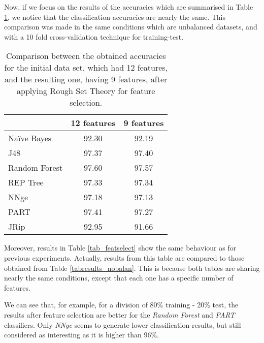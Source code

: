 \documentclass{llncs}
\begin{document}
Now, if we focus on the results of the accuracies which are summarised in Table \ref{tab_12featvs9feat}, we notice that the classification accuracies are nearly the same. This comparison was made in the same conditions which are unbalanced datasets, and with a 10 fold cross-validation technique for training-test.

\begin{table}[htpb]
\centering
 \caption{\label{tab_12featvs9feat} Comparison between the obtained accuracies for the initial data set, which had 12 features, and the resulting one, having 9 features, after applying Rough Set Theory for feature selection.}
{\small
\begin{tabular}{|l|c|c|}
\cline{2-3}
\multicolumn{1}{l|}{} & 12 features & 9 features \\
\hline
Na\"ive Bayes & 92.30 & 92.19 \\
\cline{1-1}
J48 & 97.37 & 97.40 \\
\cline{1-1}
Random Forest & 97.60 & 97.57 \\
\cline{1-1}
REP Tree & 97.33 & 97.34 \\
\cline{1-1}
NNge & 97.18 & 97.13 \\
\cline{1-1}
PART & 97.41 & 97.27 \\
\cline{1-1}
JRip & 92.95 & 91.66 \\
\hline
\end{tabular}
}
\end{table}

Moreover, results in Table \ref{tab_featselect} show the same behaviour as for previous experiments. Actually, results from this table are compared to those obtained from Table \ref{tabresults_nobalan}. This is because both tables are sharing nearly the same conditions, except that each one has a specific number of features.

We can see that, for example, for a division of 80\% training - 20\% test, the results after feature selection are better for the \textit{Random Forest} and \textit{PART} classifiers. Only \textit{NNge} seems to generate lower classification results, but still considered as interesting as it is higher than 96\%.
\end{document}
